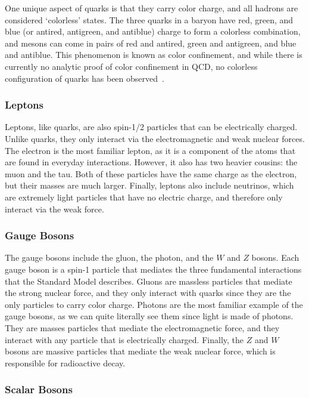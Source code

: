 One unique aspect of quarks is that they carry color charge, and all hadrons are considered `colorless' states.
The three quarks in a baryon have red, green, and blue (or antired, antigreen, and antiblue) charge to form a colorless combination, and mesons can come in pairs of red and antired, green and antigreen, and blue and antiblue.
This phenomenon is known as color confinement, and while there is currently no analytic proof of color confinement in QCD, no colorless configuration of quarks has been observed~\cite{muta2010foundations}.

\subsubsection{Leptons}

Leptons, like quarks, are also spin-1/2 particles that can be electrically charged. Unlike quarks, they only interact via the electromagnetic and weak nuclear forces.
The electron is the most familiar lepton, as it is a component of the atoms that are found in everyday interactions.
However, it also has two heavier cousins: the muon and the tau.
Both of these particles have the same charge as the electron, but their masses are much larger.
Finally, leptons also include neutrinos, which are extremely light particles that have no electric charge, and therefore only interact via the weak force.

\subsubsection{Gauge Bosons}

The gauge bosons include the gluon, the photon, and the $W$ and $Z$ bosons.
Each gauge boson is a spin-1 particle that mediates the three fundamental interactions that the Standard Model describes.
Gluons are massless particles that mediate the strong nuclear force, and they only interact with quarks since they are the only particles to carry color charge.
Photons are the most familiar example of the gauge bosons, as we can quite literally see them since light is made of photons.
They are masses particles that mediate the electromagnetic force, and they interact with any particle that is electrically charged.
Finally, the $Z$ and $W$ bosons are massive particles that mediate the weak nuclear force, which is responsible for radioactive decay.

\subsubsection{Scalar Bosons}


